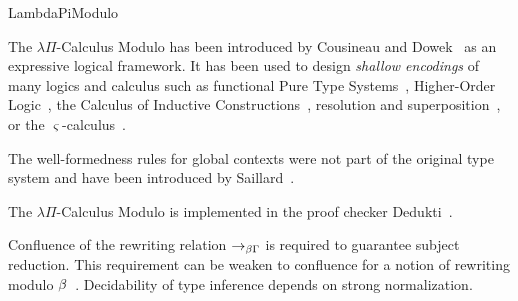 \begin{entry}{LambdaPiModulo}
\begin{history}
	The $\lambda\Pi$-Calculus Modulo has been introduced by Cousineau and Dowek~\cite{DBLP:conf/tlca/CousineauD07} as an expressive logical framework.
	It has been used to design \emph{shallow encodings} of many logics and calculus such as
	functional Pure Type Systems~\cite{DBLP:conf/tlca/CousineauD07},
	Higher-Order Logic~\cite{AliHOL},
	the Calculus of Inductive Constructions~\cite{Coqine},
	resolution and superposition~\cite{Resolution},
	or the $\varsigma$-calculus~\cite{RaphaelSigma}.

	The well-formedness rules for global contexts were not part of the original type system and have been introduced
	by Saillard~\cite{ModuloBeta}.

	The $\lambda\Pi$-Calculus Modulo is implemented in the proof checker Dedukti~\cite{Dedukti}.
\end{history}

\begin{technicalities}
	Confluence of the rewriting relation $\rightarrow_{\beta\Gamma}$ is required to guarantee subject reduction.
	This requirement can be weaken to confluence for a notion of rewriting modulo $\beta$~\cite{ModuloBeta}.
	Decidability of type inference depends on strong normalization.
\end{technicalities}



%
%
%
%
%
%
%
%






\end{entry}
